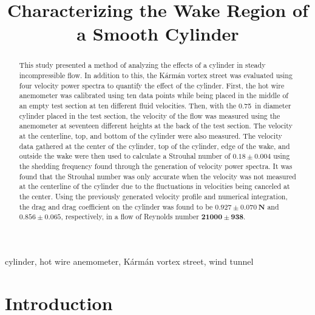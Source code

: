\documentclass[journal,letterpaper]{IEEEtran}
\begin{document}
\title{Characterizing the Wake Region of a Smooth Cylinder}

\author{
}

\maketitle
\thispagestyle{empty}

\begin{abstract}
This study presented a method of analyzing the effects of a cylinder in steady incompressible flow.
In addition to this, the Kármán vortex street was evaluated using four velocity power spectra to quantify the effect of the cylinder.
First, the hot wire anemometer was calibrated using ten data points while being placed in the middle of an empty test section at ten different fluid velocities.
Then, with the \qty{0.75}{in} diameter cylinder placed in the test section, the velocity of the flow was measured using the anemometer at seventeen different heights at the back of the test section.
The velocity at the centerline, top, and bottom of the cylinder were also measured.
The velocity data gathered at the center of the cylinder, top of the cylinder, edge of the wake, and outside the wake were then used to calculate a Strouhal number of $\bm{0.18 \pm 0.004}$ using the shedding frequency found through the generation of velocity power spectra.
It was found that the Strouhal number was only accurate when the velocity was not measured at the centerline of the cylinder due to the fluctuations in velocities being canceled at the center.
Using the previously generated velocity profile and numerical integration, the drag and drag coefficient on the cylinder was found to be $\bm{0.927 \pm }\mathbf{\qty{0.070}{\newton}}$ and $\bm{0.856 \pm 0.065}$, respectively, in a flow of Reynolds number $\bm{21000 \pm 938}$.
\end{abstract}

\begin{IEEEkeywords}
cylinder, hot wire anemometer, Kármán vortex street, wind tunnel
\end{IEEEkeywords}


\section{Introduction}
\end{document}
